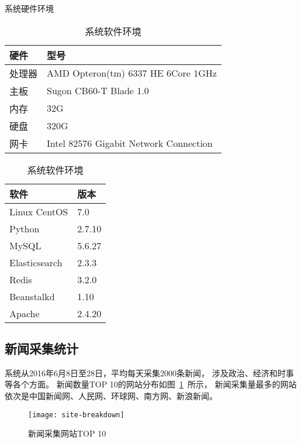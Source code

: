 \begin{table}[htbp]
\centering
\begin{minipage}{0.45\textwidth}
\caption{系统硬件环境}
\label{tbl:hard-env}
\vspace{0.5em}\centering\wuhao
\begin{tabular}{ll}
\toprule[1.5pt]
硬件 & 型号 \\
\midrule[1pt]
处理器 & AMD Opteron(tm) 6337 HE 6Core 1GHz \\
主板 & Sugon CB60-T Blade 1.0 \\
内存 & 32G \\
硬盘 & 320G \\
网卡 & Intel 82576 Gigabit Network Connection \\
\bottomrule[1.5pt]
\end{tabular}
\end{minipage}
\hfill
\begin{minipage}{0.45\textwidth}
\caption{系统软件环境}
\label{tbl:soft-env}
\vspace{0.5em}\centering\wuhao
\begin{tabular}{ll}
\toprule[1.5pt]
软件 & 版本 \\
\midrule[1pt]
Linux CentOS & 7.0 \\
Python & 2.7.10 \\
MySQL & 5.6.27 \\
Elasticsearch & 2.3.3 \\
Redis & 3.2.0 \\
Beanstalkd & 1.10 \\
Apache & 2.4.20 \\
\bottomrule[1.5pt]
\end{tabular}
\end{minipage}
\end{table}

\subsection{新闻采集统计}

系统从2016年6月8日至28日，平均每天采集2000条新闻，
涉及政治、经济和时事等各个方面。
新闻数量TOP 10的网站分布如图~\ref{fig:site-breakdown}~所示，
新闻采集量最多的网站依次是中国新闻网、人民网、环球网、南方网、新浪新闻。

\begin{figure}[htbp]
\centering
\texttt{[image: site-breakdown]}
\caption{新闻采集网站TOP 10}
\label{fig:site-breakdown}
\end{figure}

